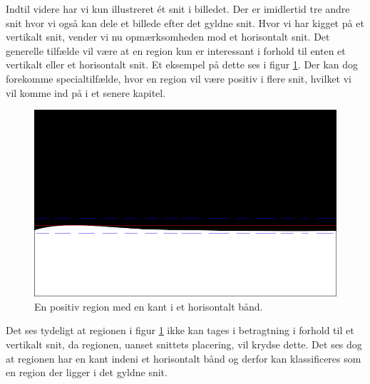 {Indtil videre har vi kun illustreret ét snit i billedet. Der er
imidlertid tre andre snit hvor vi også kan dele et billede efter det
gyldne snit. Hvor vi har kigget på et vertikalt snit, vender vi nu
opmærksomheden mod et horisontalt snit. Det generelle tilfælde vil være
at en region kun er interessant i forhold til enten et vertikalt eller
et horisontalt snit. Et eksempel på dette ses i figur
\ref{pos_horiz_naiv_margin_1}. Der kan dog forekomme specialtilfælde,
hvor en region vil være positiv i flere snit, hvilket vi vil komme ind
på i et senere kapitel.
\begin{figure}[H]
	\begin{center}
		\includegraphics[scale=\imgscale,angle=0]{afsnit/vores_implementation/billeder/naiv_algoritme/naiv_horiz_positiv_blob_1}
	\end{center}
	\caption[Positiv horisontal region]{En positiv region med en
	kant i et horisontalt bånd.}
	\label{pos_horiz_naiv_margin_1}
\end{figure}
Det ses tydeligt at regionen i figur \ref{pos_horiz_naiv_margin_1} ikke
kan tages i betragtning i forhold til et vertikalt snit, da regionen,
uanset snittets placering, vil krydse dette. Det ses dog at regionen har
en kant indeni et horisontalt bånd og derfor kan klassificeres som en
region der ligger i det gyldne snit.

}
